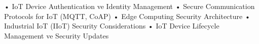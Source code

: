 • IoT Device Authentication ve Identity Management
• Secure Communication Protocols for IoT (MQTT, CoAP)
• Edge Computing Security Architecture
• Industrial IoT (IIoT) Security Considerations
• IoT Device Lifecycle Management ve Security Updates